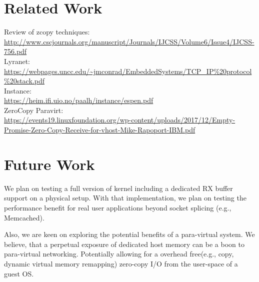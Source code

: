 \section{Related Work}
Review of zcopy techniques:\\
\url{http://www.cscjournals.org/manuscript/Journals/IJCSS/Volume6/Issue4/IJCSS-756.pdf}\\
Lyranet:\\
\url{https://webpages.uncc.edu/~jmconrad/EmbeddedSystems/TCP_IP\%20protocol\%20stack.pdf}\\
Instance:\\
\url{https://heim.ifi.uio.no/paalh/instance/espen.pdf}\\
ZeroCopy Paravirt:\\
\url{https://events19.linuxfoundation.org/wp-content/uploads/2017/12/Empty-Promise-Zero-Copy-Receive-for-vhost-Mike-Rapoport-IBM.pdf}

\section{Future Work}
We plan on testing a full version of \oursys kernel including a dedicated RX buffer support on a physical setup. With that implementation, we plan on testing the performance benefit for real user applications beyond socket splicing (e.g., Memcached).

Also, we are keen on exploring the potential benefits of \oursys a para-virtual system. We believe, that a perpetual exposure of dedicated host memory can be a boon to para-virtual networking. Potentially allowing for a overhead free(e.g., copy, dynamic virtual memory remapping) zero-copy I/O from the user-space of a guest OS.